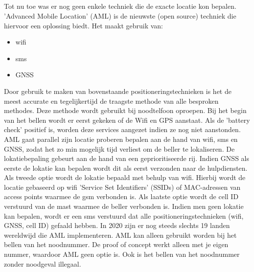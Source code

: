 \subsection{}
Tot nu toe was er nog geen enkele techniek die de exacte locatie kon bepalen. 'Advanced Mobile Location' (AML) is de nieuwste (open source) techniek die hiervoor een oplossing biedt. Het maakt gebruik van:
\begin{itemize}
	\item wifi
	\item sms
	\item GNSS
\end{itemize}
Door gebruik te maken van bovenstaande positioneringstechnieken is het de meest accurate en tegelijkertijd de traagste methode van alle besproken methodes. 
\newline
Deze methode wordt gebruikt bij noodtelfoon oproepen. Bij het begin van het bellen wordt er eerst gekeken of de Wifi en GPS aanstaat. Als de 'battery check' positief is, worden deze services aangezet indien ze nog niet aanstonden. 
\newline
AML gaat parallel zijn locatie proberen bepalen aan de hand van wifi, sms en GNSS, zodat het zo min mogelijk tijd verliest om de beller te lokaliseren. De lokatiebepaling gebeurt aan de hand van een geprioritiseerde rij. Indien GNSS als eerste de lokatie kan bepalen wordt dit als eerst verzonden naar de hulpdiensten. 
Als tweede optie wordt de lokatie bepaald met behulp van wifi. Hierbij wordt de locatie gebaseerd op wifi 'Service Set Identifiers' (SSIDs) of MAC-adressen van access points waarmee de gsm verbonden is. Als laatste optie wordt de cell ID verstuurd van de mast waarmee de beller verbonden is. Indien men geen lokatie kan bepalen, wordt er een sms verstuurd dat alle positioneringstechnieken (wifi, GNSS, cell ID) gefaald hebben.
\newline
In 2020 zijn er nog steeds slechts 19 landen wereldwijd die AML implementeren. AML kan alleen gebruikt worden bij het bellen van het noodnummer. De proof of concept werkt alleen met je eigen nummer, waardoor AML geen optie is. \autocite{aml} Ook is het bellen van het noodnummer zonder noodgeval illegaal.
